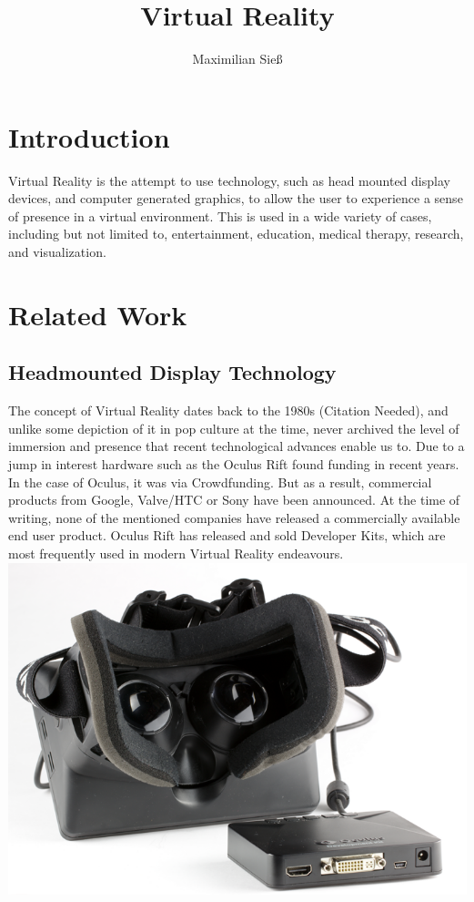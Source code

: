 \documentclass[11pt]{report}
\begin{document}
\title{Virtual Reality}
\author{Maximilian Sieß}
\maketitle

\tableofcontents


\chapter{Introduction}
Virtual Reality is the attempt to use technology, such as head mounted display devices, and computer generated graphics, to allow the user to experience a sense of presence in a virtual environment. This is used in a wide variety of cases, including but not limited to, entertainment, education, medical therapy, research, and visualization.

\chapter{Related Work}
	\section{Headmounted Display Technology}
		The concept of Virtual Reality dates back to the 1980s (Citation Needed), and unlike some depiction of it in pop culture at the time, never archived the level of immersion and presence that recent technological advances enable us to. Due to a jump in interest hardware such as the Oculus Rift found funding in recent years. In the case of Oculus, it was via Crowdfunding. But as a result, commercial products from Google, Valve/HTC or Sony have been announced. At the time of writing, none of the mentioned companies have released a commercially available end user product. Oculus Rift has released and sold Developer Kits, which are most frequently used in modern Virtual Reality endeavours.
	\includegraphics[scale=0.3]{or_small.png}
\end{document}
